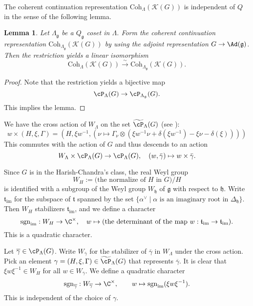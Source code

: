 \documentclass[12pt,a4paper]{amsart}
\newcommand{\CK}{{\mathcal {K}}}
\newcommand{\g}{\mathfrak g}
\newcommand{\h}{\mathfrak h}
\renewcommand{\t}{\mathfrak t}
\numberwithin{equation}{section}
\newtheorem{lem}[thm]{Lemma}
\theoremstyle{remark}
\def\cf{\emph{cf.} }
\newcommand{\cross}{\times}
\def\Coh{\mathrm{Coh}}
\newcommand{\Lam}{{[\lambda]}}
\begin{document}
The coherent continuation representation  $\Coh_{\Lambda}(\CK(G))$ is independent of $Q$ in the sense of the following lemma.
\begin{lem}%
Let $\Lambda_\g$ be a $Q_\g$ coset in $\Lambda$.  Form the coherent continuation representation $\Coh_{\Lambda_\g}(\CK(G))$ by using the adjoint representation $G\rightarrow \Ad(\g)$. Then the restriction yields a linear isomorphism
\[
  \Coh_{\Lambda}(\CK(G))\xrightarrow{\sim} \Coh_{\Lambda_\g}(\CK(G)).
\]
\end{lem}
\begin{proof}
Note that the restriction yields a bijective map
\[
   \cP_{\Lambda}(G)\rightarrow  \cP_{\Lambda_\g}(G).
\]
This implies the lemma. %
\end{proof}


We have the cross action of $W_{\Lambda}$ on the set $ \widetilde \cP_{\Lambda}(G)$ (see \cite[Definition 8.3.1]{Vg}):
\[
  w\cross(H, \xi, \Gamma)=\left(H, \xi w^{-1}, (\nu\mapsto \Gamma_\nu\otimes (\xi w^{-1}\nu+\delta(\xi w^{-1})-\xi \nu-\delta(\xi)) )\right)
\]
This commutes with the action of $G$ and thus descends to an action
\[
 W_{\Lambda}\times   \cP_{\Lambda}(G)\rightarrow \cP_{\Lambda}(G), \quad (w, \bar \gamma)\mapsto w\cross \bar \gamma.
 \]


Since $G$ is in the Harish-Chandra's class, the real Weyl group
\[
W_H:=\textrm{(the normalize of $H$ in $G$)}/H
\]
 is identified with a subgroup of the Weyl group $W_\h$ of $\g$ with respect to $\h$.
Write $\t_{\mathrm{im}}$ for the subspace of $\t$ spanned by the set $\{\alpha^\vee\mid \alpha \textrm{ is an imaginary root in $\Delta_\h$}\}$. Then $W_H$ stabilizers $\t_{\mathrm{im}}$, and we define a character
\[
  \mathrm{sgn}_\mathrm{im}: W_H\rightarrow \C^\times, \quad w\mapsto \textrm{(the determinant of the map $w: \t_{\mathrm{im}}\rightarrow \t_{\mathrm{im}}$)}.
\]
This is a quadratic character.

Let $\overline \gamma\in \cP_{\Lambda}(G)$. Write $W_{\overline \gamma}$ for the stabilizer of $\overline \gamma$ in $W_{\Lambda}$ under the cross action.
Pick an element $\gamma=(H, \xi, \Gamma)\in  \widetilde  \cP_{\Lambda}(G)$ that represents $\overline \gamma$.
It is clear that $\xi w \xi^{-1}\in W_H$ for all $w\in W_{\overline \gamma}$. We define a quadratic character
\[
  \mathrm{sgn}_{\overline \gamma}: W_{\overline \gamma}\rightarrow \C^\times, \qquad w\mapsto \mathrm{sgn}_\mathrm{im}(\xi w \xi^{-1}).
\]
This is independent of the choice of $\gamma$.
\end{document}
